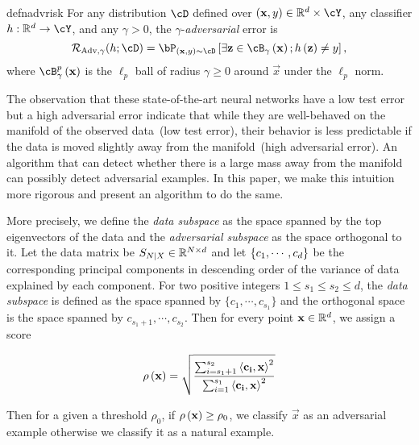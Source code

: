 \begin{restatable}{defn}{advrisk}\label{defn:adv_risk} For any distribution $\cD$
  defined over $\br{\vec{x},y}\in\reals^d\times\cY$, any classifier
  $h:\reals^d\rightarrow\cY$, and any $\gamma>0$, 
  the $\gamma$-\emph{adversarial} error is 
          \begin{equation} 
              \radv{\gamma}{h;\cD}=\bP_{\br{\vec{x},y} 
              \sim\cD}\bs{\exists \vec{z}\in\cB_{\gamma}
              \br{\vec{x}};h\br{\vec{z}}\neq y},
          \end{equation} 
  where $\cB_\gamma^p\br{\vec{x}}$ is the $\ell_p$ ball of radius $\gamma \ge
  0$ around $\vec{x}$ under the $\ell_p$ norm.
\end{restatable}

The observation that these state-of-the-art neural networks have a low test
error but a high adversarial error indicate that while they are well-behaved on
the manifold of the observed data~(low test error), their behavior is less
predictable if the data is moved slightly away from the manifold~(high
adversarial error). An algorithm that can detect whether there is a large mass away from the manifold can possibly detect adversarial examples. In this paper, we make this intuition more rigorous and present an algorithm to do the same.

More precisely, we define the {\em data subspace} as the space spanned by the
top eigenvectors of the data and the {\em adversarial subspace} as the space
orthogonal to it. Let the data matrix be \(S_{N\vert X}\in\mathbb{R}^{N\times d}\)
and let \(\left\{{c_1,\cdots,c_d}\right\}\) be the corresponding principal components in descending order of the variance of data explained by each component. For two positive integers \(1\le s_1\le s_2\le d\), the {\em data subspace} is defined as the space spanned by \(\{c_1,\cdots,c_{s_1}\}\) and the orthogonal space is the space spanned by \(c_{s_1+1},\cdots,c_{s_2}\). Then for every point \({\mathbf{x}}\in\mathbb{R}^d\), we assign a score 

\begin{equation}
  \rho\left({{\mathbf{x}}}\right) = \sqrt{\dfrac{\sum_{i=s_1+1}^{s_2}\left\langle{{\mathbf{c_i}}},{{\mathbf{x}}}\right\rangle^2}{ \sum_{i=1}^{s_1} \left\langle{{\mathbf{c_i}}},{{\mathbf{x}}}\right\rangle^2}}
\end{equation}

Then for a given a threshold \(\rho_0\), if \(\rho\left({{\mathbf{x}}}\right)\ge \rho_0\), we classify \(\vec{x}\) as an adversarial example otherwise we classify it as a natural example.

